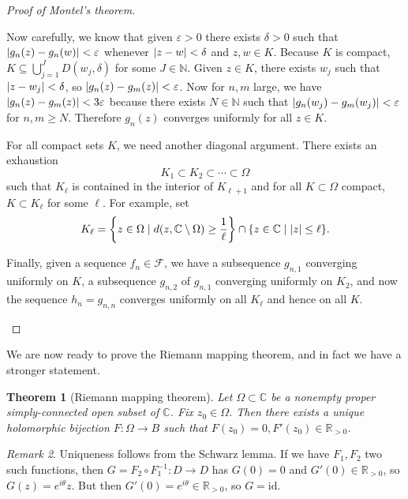 \documentclass[leqno, openany]{memoir}
\newtheorem{thm}{Theorem}[section]
\theoremstyle{definition}
\theoremstyle{remark}
\newtheorem{rmk}[thm]{Remark}
\theoremstyle{plain}
\theoremstyle{definition}
\theoremstyle{remark}
\newcommand{\R}{\mathbb{R}}
\newcommand{\C}{\mathbb{C}}
\newcommand{\N}{\mathbb{N}}
\newcommand{\ep}{\varepsilon}
\newcommand{\mc}[1]{\mathcal{#1}}
\newcommand{\mr}[1]{\mathrm{#1}}
\begin{document}
\begin{proof}[Proof of Montel's theorem]
\begin{enumerate}
            Now carefully, we know that given $\ep > 0$ there exists $\delta > 0$ such that $\abs{g_n(z) - g_n(w)} < \ep$ whenever $\abs{z-w} < \delta$ and $z,w \in K$. Because $K$ is compact, $K \subseteq \bigcup_{j=1}^J D(w_j, \delta)$ for some $J \in \N$. Given $z \in K$, there exists $w_j$ such that $\abs{z-w_j} < \delta$, so $\abs{g_n(z) - g_m(z)} < \ep$. Now for $n,m$ large, we have $\abs{g_n(z) - g_m(z)} < 3 \ep$ because there exists $N \in \N$ such that $\abs{g_n(w_j) - g_m(w_j)} < \ep$ for $n,m \geq N$. Therefore $g_n(z)$ converges uniformly for all $z \in K$.

            For all compact sets $K$, we need another diagonal argument. There exists an exhaustion 
            \[ K_1 \subset K_2 \subset \cdots \subset \Omega \]
            such that $K_{\ell}$ is contained in the interior of $K_{\ell + 1}$ and for all $K \subset \Omega$ compact, $K \subset K_{\ell}$ for some $\ell$. For example, set 
            \[ K_{\ell} = \qty{z \in \Omega \mid d(z, \C \setminus \Omega) \geq \frac{1}{\ell}} \cap \qty{z \in \C \mid \abs{z} \leq \ell}. \]

            Finally, given a sequence $f_n \in \mc{F}$, we have a subsequence $g_{n,1}$ converging uniformly on $K$, a subsequence $g_{n,2}$ of $g_{n,1}$ converging uniformly on $K_2$, and now the sequence $h_n = g_{n,n}$ converges uniformly on all $K_{\ell}$ and hence on all $K$. \qedhere
    \end{enumerate}
\end{proof}

We are now ready to prove the Riemann mapping theorem, and in fact we have a stronger statement.

\begin{thm}[Riemann mapping theorem]
    Let $\Omega \subset \C$ be a nonempty proper simply-connected open subset of $\C$. Fix $z_0 \in \Omega$. Then there exists a unique holomorphic bijection $F \colon \Omega \to B$ such that $F(z_0) = 0, F'(z_0) \in \R_{>0}$.
\end{thm}

\begin{rmk}
    Uniqueness follows from the Schwarz lemma. If we have $F_1, F_2$ two such functions, then $G = F_2 \circ F_1^{-1} \colon D \to D$ has $G(0) = 0$ and $G'(0) \in \R_{>0}$, so $G(z) = e^{i\theta} z$. But then $G'(0) = e^{i \theta} \in \R_{>0}$, so $G = \mr{id}$.
\end{rmk}
\end{document}
